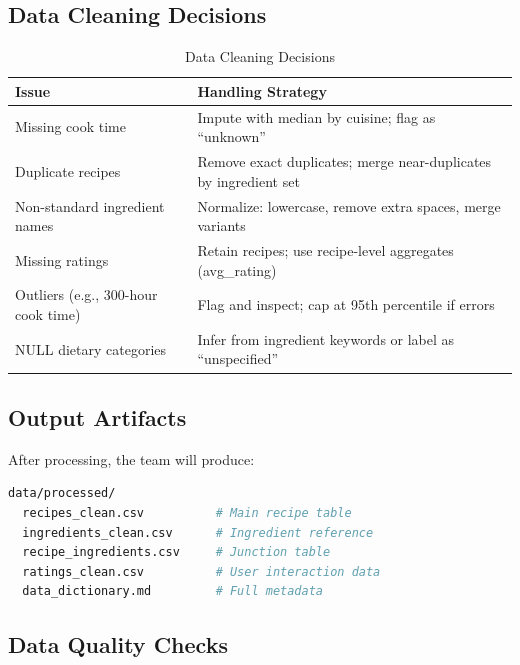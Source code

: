 \documentclass[11pt,a4paper]{article}
\begin{document}
\subsection{Data Cleaning Decisions}

\begin{table}[H]
    \centering
    \begin{tabular}{|p{2.5cm}|p{8cm}|}
        \hline
        \textbf{Issue} & \textbf{Handling Strategy} \\
        \hline
        Missing cook time & Impute with median by cuisine; flag as ``unknown'' \\
        \hline
        Duplicate recipes & Remove exact duplicates; merge near-duplicates by ingredient set \\
        \hline
        Non-standard ingredient names & Normalize: lowercase, remove extra spaces, merge variants \\
        \hline
        Missing ratings & Retain recipes; use recipe-level aggregates (avg\_rating) \\
        \hline
        Outliers (e.g., 300-hour cook time) & Flag and inspect; cap at 95th percentile if errors \\
        \hline
        NULL dietary categories & Infer from ingredient keywords or label as ``unspecified'' \\
        \hline
    \end{tabular}
    \caption{Data Cleaning Decisions}
    \label{tab:cleaning}
\end{table}

\subsection{Output Artifacts}

After processing, the team will produce:

\begin{lstlisting}[language=bash, caption=Output Files from Ingestion Pipeline]
data/processed/
  recipes_clean.csv          # Main recipe table
  ingredients_clean.csv      # Ingredient reference
  recipe_ingredients.csv     # Junction table
  ratings_clean.csv          # User interaction data
  data_dictionary.md         # Full metadata
\end{lstlisting}

\subsection{Data Quality Checks}
\end{document}
